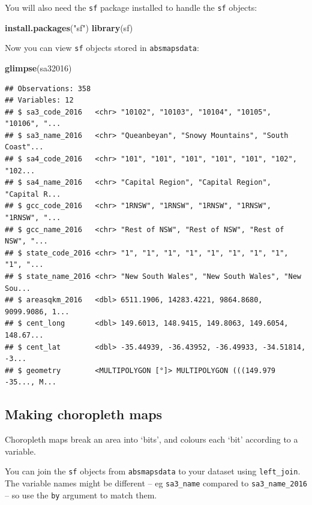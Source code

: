 \documentclass[]{book}
\newenvironment{Shaded}{\begin{snugshade}}{\end{snugshade}}
\newcommand{\KeywordTok}[1]{\textcolor[rgb]{0.13,0.29,0.53}{\textbf{#1}}}
\newcommand{\NormalTok}[1]{#1}
\newcommand{\StringTok}[1]{\textcolor[rgb]{0.31,0.60,0.02}{#1}}
\begin{document}
You will also need the \texttt{sf} package installed to handle the \texttt{sf} objects:

\begin{Shaded}
\begin{Highlighting}[]
\KeywordTok{install.packages}\NormalTok{(}\StringTok{"sf"}\NormalTok{)}
\KeywordTok{library}\NormalTok{(sf)}
\end{Highlighting}
\end{Shaded}

Now you can view \texttt{sf} objects stored in \texttt{absmapsdata}:

\begin{Shaded}
\begin{Highlighting}[]
\KeywordTok{glimpse}\NormalTok{(sa32016)}
\end{Highlighting}
\end{Shaded}

\begin{verbatim}
## Observations: 358
## Variables: 12
## $ sa3_code_2016   <chr> "10102", "10103", "10104", "10105", "10106", "...
## $ sa3_name_2016   <chr> "Queanbeyan", "Snowy Mountains", "South Coast"...
## $ sa4_code_2016   <chr> "101", "101", "101", "101", "101", "102", "102...
## $ sa4_name_2016   <chr> "Capital Region", "Capital Region", "Capital R...
## $ gcc_code_2016   <chr> "1RNSW", "1RNSW", "1RNSW", "1RNSW", "1RNSW", "...
## $ gcc_name_2016   <chr> "Rest of NSW", "Rest of NSW", "Rest of NSW", "...
## $ state_code_2016 <chr> "1", "1", "1", "1", "1", "1", "1", "1", "1", "...
## $ state_name_2016 <chr> "New South Wales", "New South Wales", "New Sou...
## $ areasqkm_2016   <dbl> 6511.1906, 14283.4221, 9864.8680, 9099.9086, 1...
## $ cent_long       <dbl> 149.6013, 148.9415, 149.8063, 149.6054, 148.67...
## $ cent_lat        <dbl> -35.44939, -36.43952, -36.49933, -34.51814, -3...
## $ geometry        <MULTIPOLYGON [°]> MULTIPOLYGON (((149.979 -35..., M...
\end{verbatim}

\hypertarget{making-choropleth-maps}{%
\subsection{Making choropleth maps}\label{making-choropleth-maps}}

Choropleth maps break an area into `bits', and colours each `bit' according to a variable.

You can join the \texttt{sf} objects from \texttt{absmapsdata} to your dataset using \texttt{left\_join}. The variable names might be different -- eg \texttt{sa3\_name} compared to \texttt{sa3\_name\_2016} -- so use the \texttt{by} argument to match them.
\end{document}
